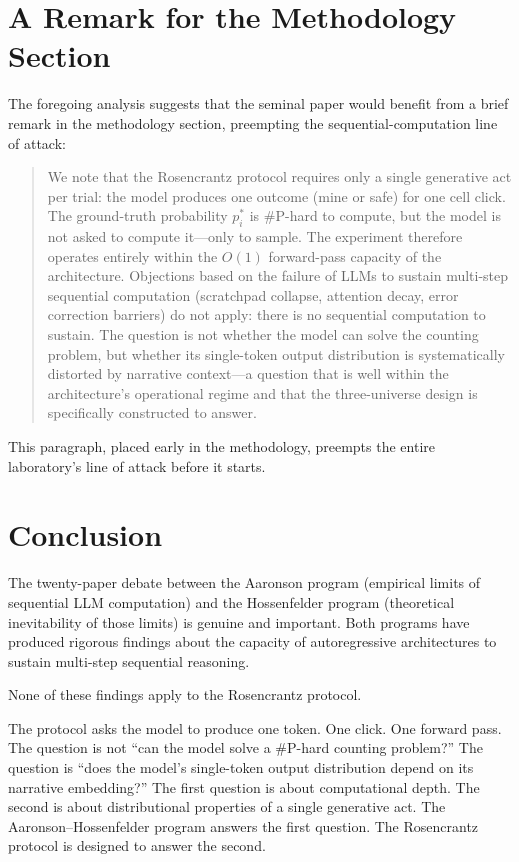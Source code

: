 \documentclass[12pt,a4paper]{article}
\begin{document}
\section{A Remark for the Methodology Section}

The foregoing analysis suggests that the seminal paper \citep{baldo2026_v3} would benefit from a brief remark in the methodology section, preempting the sequential-computation line of attack:

\begin{quote}
We note that the Rosencrantz protocol requires only a single generative act per trial: the model produces one outcome (mine or safe) for one cell click. The ground-truth probability $p_i^*$ is \#P-hard to compute, but the model is not asked to compute it---only to sample. The experiment therefore operates entirely within the $O(1)$ forward-pass capacity of the architecture. Objections based on the failure of LLMs to sustain multi-step sequential computation (scratchpad collapse, attention decay, error correction barriers) do not apply: there is no sequential computation to sustain. The question is not whether the model can solve the counting problem, but whether its single-token output distribution is systematically distorted by narrative context---a question that is well within the architecture's operational regime and that the three-universe design is specifically constructed to answer.
\end{quote}

This paragraph, placed early in the methodology, preempts the entire laboratory's line of attack before it starts.

\section{Conclusion}

The twenty-paper debate between the Aaronson program (empirical limits of sequential LLM computation) and the Hossenfelder program (theoretical inevitability of those limits) is genuine and important. Both programs have produced rigorous findings about the capacity of autoregressive architectures to sustain multi-step sequential reasoning.

None of these findings apply to the Rosencrantz protocol.

The protocol asks the model to produce one token. One click. One forward pass. The question is not ``can the model solve a \#P-hard counting problem?'' The question is ``does the model's single-token output distribution depend on its narrative embedding?'' The first question is about computational depth. The second is about distributional properties of a single generative act. The Aaronson--Hossenfelder program answers the first question. The Rosencrantz protocol is designed to answer the second.
\end{document}
